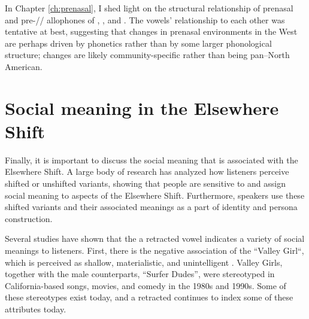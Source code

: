 In Chapter \ref{ch:prenasal}, I shed light on the structural relationship of prenasal and pre-// allophones of \trap, \dress, and \kit. The vowels' relationship to each other was tentative at best, suggesting that changes in prenasal environments in the West are perhaps driven by phonetics rather than by some larger phonological structure; changes are likely community-specific rather than being pan--North American.





\section{Social meaning in the Elsewhere Shift}
\label{sec:social_meaning_elsewhere_shift}

Finally, it is important to discuss the social meaning that is associated with the Elsewhere Shift. A large body of research has analyzed how listeners perceive shifted or unshifted variants, showing that people are sensitive to and assign social meaning to aspects of the Elsewhere Shift. Furthermore, speakers use these shifted variants and their associated meanings as a part of identity and persona construction.

Several studies have shown that the a retracted \bat vowel indicates a variety of social meanings to listeners. First, there is the negative association of the ``Valley Girl``, which is perceived as  shallow, materialistic, and unintelligent \citep[47]{donofrio_2016_diss}. Valley Girls, together with the male counterparts, ``Surfer Dudes'', were stereotyped in California-based songs, movies, and comedy in the 1980s and 1990s. Some of these stereotypes exist today, and a retracted \bat continues to index some of these attributes today.

